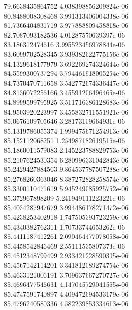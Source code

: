 {79.6638435864752 4.038398856209824e-06 \\
80.8488008308468 3.991313406004338e-06 \\
81.7366404831719 3.977888809458818e-06 \\
82.7087093182536 4.01287570639397e-06 \\
83.186312474616 3.995523456978844e-06 \\
83.6099702528345 3.939382622775156e-06 \\
84.1329618177979 3.692269274324644e-06 \\
84.5599300737294 3.794461918005254e-06 \\
84.7370470711658 3.542772674336447e-06 \\
84.8136072256166 3.45591206496465e-06 \\
84.8999599795925 3.511716386128683e-06 \\
84.9503920223997 3.455832711551921e-06 \\
85.0676109705646 3.28173109664931e-06 \\
85.1319786055374 1.999475671254913e-06 \\
85.152112068251 1.254987182619516e-06 \\
85.1860011579083 2.145223788829753e-06 \\
85.2107624530354 6.280996331042843e-06 \\
85.2429427884563 9.864537787507288e-06 \\
85.2768260363046 8.387272828258574e-06 \\
85.3300110471619 5.945249085925752e-06 \\
85.372967898209 5.241949111223221e-06 \\
85.4034287947679 3.994486178271472e-06 \\
85.4238253402918 1.747505393723259e-06 \\
85.4340382762311 1.70733744653262e-06 \\
85.4411187412261 2.090464477078058e-06 \\
85.4458542846469 2.55111535807373e-06 \\
85.4512348799499 2.933421228590305e-06 \\
85.4567142114201 3.341812089274754e-06 \\
85.4633121006191 3.709637667270727e-06 \\
85.4696477546631 4.147045729041565e-06 \\
85.4747591740897 4.409472694533179e-06 \\
85.4796240580336 4.582239853334613e-06 \\
}
